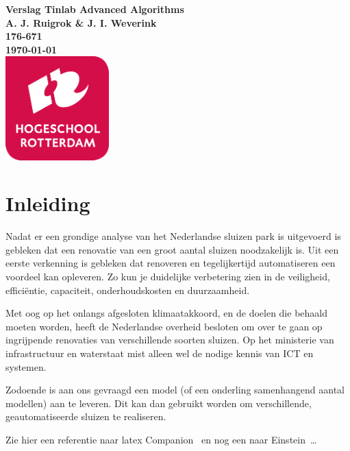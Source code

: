 \documentclass{article}
\begin{document}
\graphicspath{{../Images/}}
\sffamily
\begin{titlepage}
  \centering
    \vfill
    {\bfseries\Huge
      Verslag Tinlab Advanced Algorithms \\
        \vskip2cm
      }
      {\bfseries\Large
        A. J. Ruigrok \& J. I. Weverink\\
      }
      {
        \bfseries\normalsize
        176-671\\
        \vskip1cm
        \today\\
    }
    \vfill
    \includegraphics[width=4cm]{logohr.png} %
    \vfill
    \vfill
\end{titlepage}
\newpage
\tableofcontents

\clearpage %
\section{Inleiding}
Nadat er een grondige analyse van het Nederlandse sluizen park is uitgevoerd is gebleken dat een renovatie van een groot aantal sluizen noodzakelijk is. Uit een eerste verkenning is gebleken dat renoveren en tegelijkertijd automatiseren een voordeel kan opleveren. Zo kun je duidelijke verbetering zien in de veiligheid, efficiëntie, capaciteit, onderhoudskosten en duurzaamheid.

Met oog op het onlangs afgesloten klimaatakkoord, en de doelen die behaald moeten worden, heeft de Nederlandse overheid besloten om over te gaan op ingrijpende renovaties van verschillende soorten sluizen. Op het ministerie van infrastructuur en waterstaat mist alleen wel de nodige kennis van ICT en systemen.

Zodoende is aan ons gevraagd een model (of een onderling samenhangend aantal modellen) aan te leveren. Dit kan dan gebruikt worden om verschillende, geautomatiseerde sluizen te realiseren.

Zie hier een referentie naar latex Companion~\cite{latexcompanion} en nog een naar Einstein~\cite{einstein}\ldots 
\end{document}
